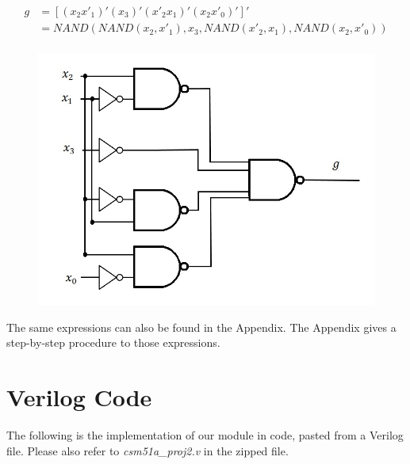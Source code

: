 \documentclass{article}
\begin{document}
\clearpage


\begin{equation*}
\begin{split}
g & = [ (x_2 x'_1)' (x_3)' (x'_2 x_1)' (x_2 x'_0)' ]' \\ 
  & = NAND(NAND(x_2, x'_1), x_3, NAND(x'_2, x_1), NAND(x_2, x'_0)) \\
\end{split}
\end{equation*}
\begin{figure}[h!]
\centering
\includegraphics[scale=0.25]{g-NAND-NAND}
\end{figure}

The same expressions can also be found in the Appendix. The Appendix gives a 
step-by-step procedure to those expressions.
 

\section{Verilog Code}
The following is the implementation of our module in code, pasted from a 
Verilog file. Please also refer to \textit{csm51a\_proj2.v} in the zipped 
file.\\
\end{document}
